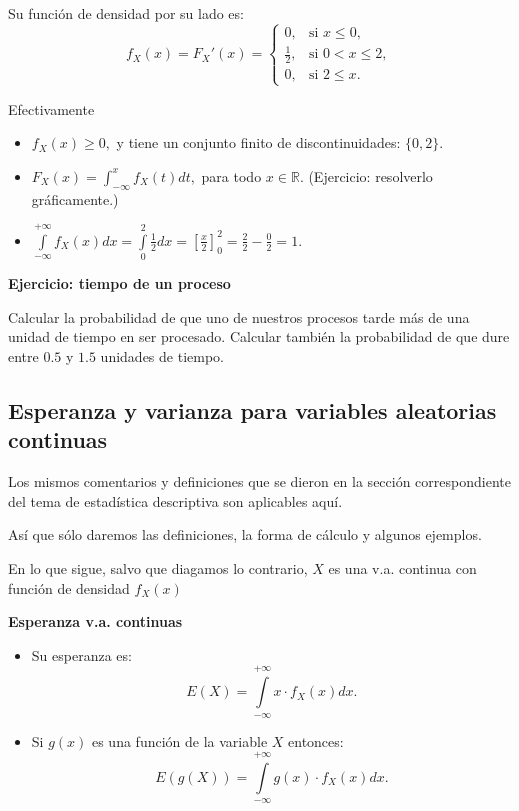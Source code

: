 \documentclass[]{book}
\providecommand{\tightlist}{%
  \setlength{\itemsep}{0pt}\setlength{\parskip}{0pt}}
\begin{document}
Su función de densidad por su lado es:
\[
f_{X}(x)=F_{X}'(x)=\left\{\begin{array}{ll}
0, & \mbox{si } x\leq 0,\\[1ex]
\frac12, & \mbox{si } 0<x\leq 2,\\[1ex]
0, & \mbox{si } 2\leq x.
\end{array}\right.
\]

Efectivamente

\begin{itemize}
\item
  \(f_{X}(x)\geq 0,\) y tiene un conjunto finito de discontinuidades: \(\{0,2\}\).
\item
  \(F_X(x)=\int_{-\infty}^x f_X(t) dt,\) para todo \(x\in \mathbb{R}\). (Ejercicio: resolverlo gráficamente.)
\item
  \(\displaystyle\int\limits_{-\infty}^{+\infty}f_{X}(x)dx= \int\limits_0^2\frac12dx=\left[\frac{x}2\right]_0^2=\frac22-\frac02=1.\)
\end{itemize}

\textbf{Ejercicio: tiempo de un proceso}

Calcular la probabilidad de que uno de nuestros procesos tarde
más de una unidad de tiempo en ser procesado. Calcular también la probabilidad de
que dure entre \(0.5\) y \(1.5\) unidades de tiempo.

\hypertarget{esperanza-y-varianza-para-variables-aleatorias-continuas}{%
\subsection{Esperanza y varianza para variables aleatorias continuas}\label{esperanza-y-varianza-para-variables-aleatorias-continuas}}

Los mismos comentarios y definiciones que se dieron en la sección correspondiente del tema
de estadística descriptiva son aplicables aquí.

Así que sólo daremos las definiciones, la forma de cálculo y algunos ejemplos.

En lo que sigue, salvo que diagamos lo contrario, \(X\) es una v.a. continua con función de densidad \(f_{X}(x)\)

 \textbf{Esperanza v.a. continuas}

\begin{itemize}
\tightlist
\item
  Su esperanza es:
  \[E(X)=\displaystyle\int\limits_{-\infty}^{+\infty} x\cdot f_{X}(x)dx.\]
\item
  Si \(g(x)\) es una función de la variable \(X\) entonces:
  \[E(g(X))=\displaystyle\int\limits_{-\infty}^{+\infty} g(x)\cdot f_{X}(x)dx.\]
\end{itemize}
\end{document}
